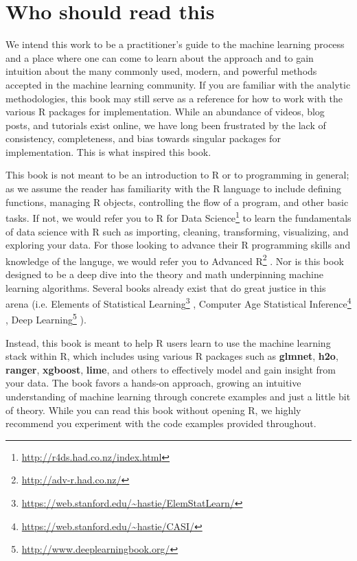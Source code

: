 \documentclass[]{krantz}
\renewcommand{\href}[2]{#2\footnote{\url{#1}}}
\begin{document}
\hypertarget{who-should-read-this}{%
\section*{Who should read this}\label{who-should-read-this}}


We intend this work to be a practitioner's guide to the machine learning process and a place where one can come to learn about the approach and to gain intuition about the many commonly used, modern, and powerful methods accepted in the machine learning community. If you are familiar with the analytic methodologies, this book may still serve as a reference for how to work with the various R packages for implementation. While an abundance of videos, blog posts, and tutorials exist online, we have long been frustrated by the lack of consistency, completeness, and bias towards singular packages for implementation. This is what inspired this book.

This book is not meant to be an introduction to R or to programming in general; as we assume the reader has familiarity with the R language to include defining functions, managing R objects, controlling the flow of a program, and other basic tasks. If not, we would refer you to \href{http://r4ds.had.co.nz/index.html}{R for Data Science} \citep{wickham2016r} to learn the fundamentals of data science with R such as importing, cleaning, transforming, visualizing, and exploring your data. For those looking to advance their R programming skills and knowledge of the languge, we would refer you to \href{http://adv-r.had.co.nz/}{Advanced R} \citep{wickham2014advanced}. Nor is this book designed to be a deep dive into the theory and math underpinning machine learning algorithms. Several books already exist that do great justice in this arena (i.e. \href{https://web.stanford.edu/~hastie/ElemStatLearn/}{Elements of Statistical Learning} \citep{esl}, \href{https://web.stanford.edu/~hastie/CASI/}{Computer Age Statistical Inference} \citep{efron2016computer}, \href{http://www.deeplearningbook.org/}{Deep Learning} \citep{goodfellow2016deep}).

Instead, this book is meant to help R users learn to use the machine learning stack within R, which includes using various R packages such as \textbf{glmnet}, \textbf{h2o}, \textbf{ranger}, \textbf{xgboost}, \textbf{lime}, and others to effectively model and gain insight from your data. The book favors a hands-on approach, growing an intuitive understanding of machine learning through concrete examples and just a little bit of theory. While you can read this book without opening R, we highly recommend you experiment with the code examples provided throughout.
\end{document}

